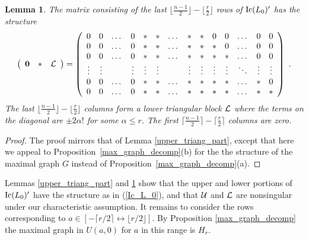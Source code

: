 \documentclass{amsproc}
\newtheorem{lemma}[theorem]{Lemma}
\theoremstyle{definition}
\theoremstyle{remark}
\numberwithin{equation}{section}
\newcommand{\Ic}{{\rm Ic}}
\newcommand{\interval}{\longleftrightarrow}
\begin{document}
\begin{lemma}\label{lower_triang_part}
The matrix consisting of the last $\lfloor\frac{n-1}2\rfloor-\lfloor\frac r 2\rfloor$ rows of $\Ic(L_0)'$ has the structure
\[\left(\begin{array}{ccc} {\bf 0}&\ast& \mathcal{L}\end{array}\right)=
\left(\begin{array}{cccccccccccccc}
0         & 0         & \dots & 0         & \ast     & \ast     & \dots & \ast    & \ast    & 0          & 0         & \dots   & 0         & 0\\
0         & 0         & \dots & 0         & \ast     & \ast     & \dots & \ast    & \ast    & \ast      & 0         & \dots   & 0         & 0\\
0         & 0         & \dots & 0         & \ast     & \ast     & \dots & \ast    & \ast    & \ast      & \ast     & \dots   & 0         & 0\\
\vdots & \vdots &          & \vdots & \vdots & \vdots &         & \vdots & \vdots & \vdots & \vdots & \ddots & \vdots & \vdots\\
0         & 0         & \dots & 0          & \ast    & \ast     & \dots & \ast     & \ast    & \ast     & \ast     & \dots    & \ast    & 0\\
0         & 0         & \dots & 0          & \ast    & \ast     & \dots & \ast     & \ast    & \ast     & \ast     & \dots    & \ast    & \ast\\
\end{array}\right)\ .\]
The last $\lfloor\frac{n-1}2\rfloor-\lfloor\frac r 2\rfloor$ columns form a lower triangular block $\mathcal{L}$ where the terms on the diagonal are $\pm 2\alpha!$ for some $\alpha\leqslant r$. The first $\lceil\frac{n-1}2\rceil-\lceil\frac r 2\rceil$ columns are zero.
\end{lemma}

\begin{proof}
The proof mirrors that of Lemma \ref{upper_triang_part}, except that here we appeal to Proposition~\ref{max_graph_decomp}(b) for the
the structure of the maximal graph $G$ instead of Proposition~\ref{max_graph_decomp}(a).
\end{proof}

Lemmas \ref{upper_triang_part} and \ref{lower_triang_part} show that the upper and lower portions of $\Ic(L_0)'$ have the structure as in (\ref{Ic_L_0}), and that $\mathcal{U}$ and $\mathcal{L}$ are nonsingular under our characteristic assumption. It remains to consider the rows corresponding to $a\in[-\lceil r/2\rceil\interval \lfloor r/2\rfloor]$. By Proposition \ref{max_graph_decomp} the maximal graph in $U(a,0)$ for $a$ in this range is $H_r$.
\end{document}
